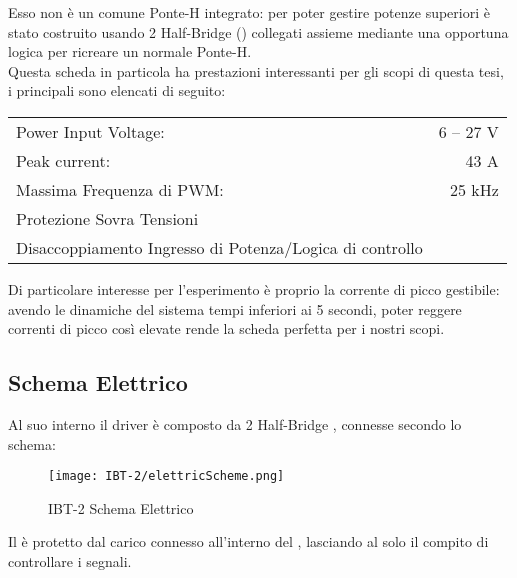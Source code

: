 \noindent
Esso non è un comune Ponte-H integrato: per poter gestire potenze superiori è stato costruito usando 2 Half-Bridge (\cite{BTS7960b}) collegati assieme mediante una opportuna logica per ricreare un normale Ponte-H.\\
Questa scheda in particola ha prestazioni interessanti per gli scopi di questa tesi, i principali sono elencati di seguito:\vspace{-8mm}
\begin{center}
	\begin{tabular}[t]{|l r|}
		\hline
		Power Input Voltage:                                     & 6 -- 27 V \\
		Peak current:                                            & 43 A      \\
		Massima Frequenza di PWM:                                & 25 kHz    \\
		Protezione Sovra Tensioni                                &           \\
		Disaccoppiamento Ingresso di Potenza/Logica di controllo &           \\
		\hline
	\end{tabular}
\end{center}
\noindent
Di particolare interesse per l'esperimento è proprio la corrente di picco gestibile:
avendo le dinamiche del sistema tempi inferiori ai 5 secondi, poter reggere correnti di picco così elevate rende
la scheda perfetta per i nostri scopi.

\newpage
\subsection{Schema Elettrico}
Al suo interno il driver è composto da 2 Half-Bridge \cite{BTS7960b}, connesse secondo lo schema:
\begin{figure}[h]
	\centering
	\texttt{[image: IBT-2/elettricScheme.png]}
	\caption[IBT-2 Schema Elettrico]{IBT-2 Schema Elettrico}
\end{figure}\vspace{-5mm}

\noindent
Il \microC è protetto dal carico connesso all'interno del , lasciando al \microC solo il compito di controllare i segnali.


